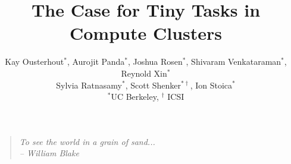 \documentclass[pdftex,twocolumn,10pt,letterpaper]{article}
\begin{document}
\title{\large \bf The Case for Tiny Tasks in Compute Clusters}
\author{
{\rm Kay Ousterhout$^*$, Aurojit Panda$^*$, Joshua Rosen$^*$, Shivaram Venkataraman$^*$, Reynold Xin$^*$}\\
\rm{Sylvia Ratnasamy$^*$, Scott Shenker$^{*\dag}$, Ion Stoica$^*$} \\
$^*$UC Berkeley, $^\dag$ ICSI
}
\date{}

\thispagestyle{empty}


\maketitle
\vspace{1in}

\begin{quote}
  \textit{To see the world in a grain of sand...}\\
  \textit{-- William Blake}
\end{quote}





%





\end{document}
